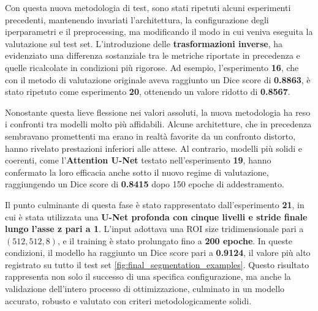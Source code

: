 
Con questa nuova metodologia di test, sono stati ripetuti alcuni esperimenti precedenti, mantenendo invariati l’architettura, la configurazione degli iperparametri e il preprocessing, ma modificando il modo in cui veniva eseguita la valutazione sul test set. L’introduzione delle \textbf{trasformazioni inverse}, ha evidenziato una differenza sostanziale tra le metriche riportate in precedenza e quelle ricalcolate in condizioni più rigorose. Ad esempio, l’esperimento \textbf{16}, che con il metodo di valutazione originale aveva raggiunto un Dice score di \textbf{0.8863}, è stato ripetuto come esperimento \textbf{20}, ottenendo un valore ridotto di \textbf{0.8567}. 

Nonostante questa lieve flessione nei valori assoluti, la nuova metodologia ha reso i confronti tra modelli molto più affidabili. Alcune architetture, che in precedenza sembravano promettenti ma erano in realtà favorite da un confronto distorto, hanno rivelato prestazioni inferiori alle attese. Al contrario, modelli più solidi e coerenti, come l’\textbf{Attention U-Net} testato nell’esperimento \textbf{19}, hanno confermato la loro efficacia anche sotto il nuovo regime di valutazione, raggiungendo un Dice score di \textbf{0.8415} dopo 150 epoche di addestramento.

Il punto culminante di questa fase è stato rappresentato dall’esperimento \textbf{21}, in cui è stata utilizzata una \textbf{U-Net profonda con cinque livelli e stride finale lungo l’asse z pari a 1}. L’input adottava una ROI size tridimensionale pari a $(512, 512, 8)$, e il training è stato prolungato fino a \textbf{200 epoche}. In queste condizioni, il modello ha raggiunto un Dice score pari a \textbf{0.9124}, il valore più alto registrato su tutto il test set \ref{fig:final_segmentation_examples}. Questo risultato rappresenta non solo il successo di una specifica configurazione, ma anche la validazione dell’intero processo di ottimizzazione, culminato in un modello accurato, robusto e valutato con criteri metodologicamente solidi.

